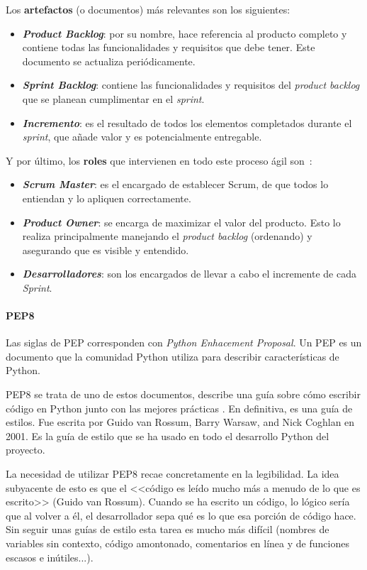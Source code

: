 Los \textbf{artefactos} (o documentos) más relevantes son los siguientes:
\begin{itemize}
	\item \textbf{\textit{Product Backlog}}: por su nombre, hace referencia al
	producto completo y contiene todas las funcionalidades y requisitos que debe
	tener. Este documento se actualiza periódicamente.
	\item \textbf{\textit{Sprint Backlog}}: contiene las funcionalidades y
	requisitos del \textit{product backlog} que se planean cumplimentar en el
	\emph{sprint}.
	\item \textbf{\textit{Incremento}}: es el resultado de todos los elementos
	completados durante el \emph{sprint}, que añade valor y es potencialmente
	entregable.
\end{itemize}

Y por último, los \textbf{roles} que intervienen en todo este proceso ágil son~\cite{scrum:team}:
\begin{itemize}
	\item \textbf{\textit{Scrum Master}}: es el encargado de establecer Scrum,
	de que todos lo entiendan y lo apliquen correctamente.
	\item \textbf{\textit{Product Owner}}: se encarga de maximizar el valor del
	producto. Esto lo realiza principalmente manejando el \textit{product
	backlog} (ordenando) y asegurando que es visible y entendido.
	\item \textbf{\textit{Desarrolladores}}: son los encargados de llevar a cabo
	el incremente de cada \textit{Sprint}.
\end{itemize}


\paragraph{PEP8} Las siglas de PEP corresponden con \textit{Python Enhacement
Proposal}. Un PEP es un documento que la comunidad Python utiliza para describir
características de Python.

PEP8 se trata de uno de estos documentos, describe una guía sobre cómo escribir
código en Python junto con las mejores prácticas \cite{pep8:desc}. En
definitiva, es una guía de estilos. Fue escrita por Guido van Rossum, Barry
Warsaw, and Nick Coghlan en 2001. Es la guía de estilo que se ha usado en todo
el desarrollo Python del proyecto.

La necesidad de utilizar PEP8 recae concretamente en la legibilidad. La idea
subyacente de esto es que el <<código es leído mucho más a menudo de lo que es
escrito>> (Guido van Rossum). Cuando se ha escrito un código, lo lógico sería
que al volver a él, el desarrollador sepa qué es lo que esa porción de código
hace. Sin seguir unas guías de estilo esta tarea es mucho más difícil (nombres
de variables sin contexto, código amontonado, comentarios en línea y de
funciones escasos e inútiles...).

